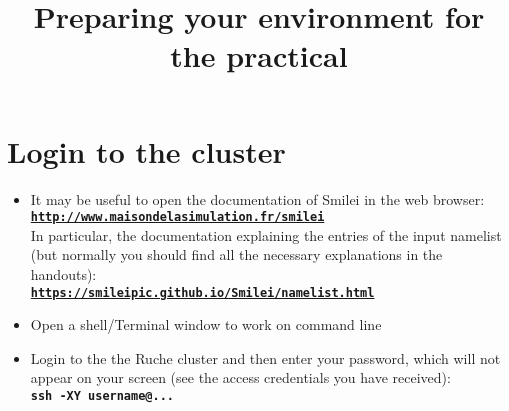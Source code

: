 \documentclass{article}
\title{\vspace{-2.cm}Preparing  your environment for the practical}
\newcommand{\smilei}{{\sc Smilei}\xspace}
\newcommand{\commandline}[1]{\texttt{\textbf{#1}}}
\begin{document}
\maketitle

\tableofcontents



\section{Login to the cluster}
\begin{itemize}

\item It may be useful to open the documentation of \smilei in the web browser:\\
 	\commandline{\url{http://www.maisondelasimulation.fr/smilei}}	\\
	In particular, the documentation explaining the entries of the input namelist (but normally you should find all the necessary explanations in the handouts):\\
\commandline{\url{https://smileipic.github.io/Smilei/namelist.html}}

\item Open a shell/Terminal window to work on command line

\item Login to the the Ruche cluster and then enter your password, which will not appear on your screen (see the access credentials you have received):\\
\commandline{ssh -XY username@...}\\

\end{itemize}
\end{document}
